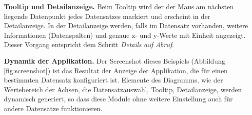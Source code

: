 \textbf{Tooltip und Detailanzeige.} Beim Tooltip wird der der Maus am nächsten liegende Datenpunkt jedes Datensatzes markiert und erscheint in der Detailanzeige. In der Detailanzeige werden, falls im Datensatz vorhanden, weitere Informationen (Datenspalten) und genaue x- und y-Werte mit Einheit angezeigt. Dieser Vorgang entspricht dem Schritt \textit{Details auf Abruf}.

\textbf{Dynamik der Applikation.} Der Screenshot dieses Beispiels (Abbildung \ref{fig:screenshot}) ist das Resultat der Anzeige der Applikation, die für einen bestimmten Datensatz konfiguriert ist. Elemente des Diagramms, wie der Wertebereich der Achsen, die Datensatzauswahl, Tooltip, Detailanzeige, werden dynamisch generiert, so dass diese Module ohne weitere Einstellung auch für andere Datensätze funktionieren.

